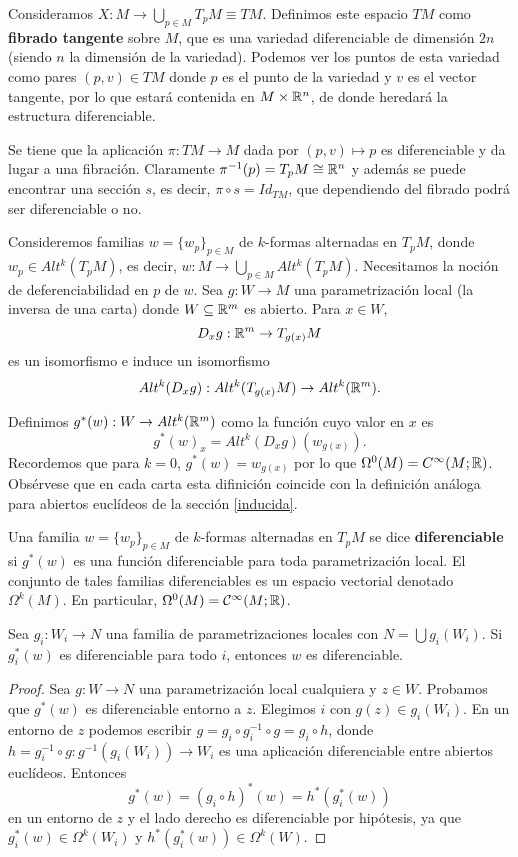 \documentclass[CV.tex]{subfiles}
\begin{document}
\begin{defi}
Consideramos $X:M\to \bigcup_{p\in M}T_pM \equiv TM$. Definimos este espacio $TM$ como \textbf{fibrado tangente} sobre $M$, que es una variedad diferenciable de dimensión $2n$ (siendo $n$ la dimensión de la variedad). Podemos ver los puntos de esta variedad como pares $(p,v)\in TM$ donde $p$ es el punto de la variedad y $v$ es el vector tangente, por lo que estará contenida en $M\times \mathbb{R}^n$, de donde heredará la estructura diferenciable. 
\end{defi}

Se tiene que la aplicación $\pi :TM\to M$ dada por $(p,v)\mapsto p$ es diferenciable y da lugar a una fibración. Claramente $\pi^{-1}(p)=T_pM\cong\mathbb{R}^n$ y además se puede encontrar una sección $s$, es decir, $\pi\circ s=Id_{TM}$, que dependiendo del fibrado podrá ser diferenciable o no.

Consideremos familias $w=\{w_p\}_{p\in M}$ de $k$-formas alternadas en $T_pM$, donde $w_p\in Alt^k(T_pM)$, es decir, $w:M\to \bigcup_{p\in M}Alt^k(T_pM)$. Necesitamos la noción de deferenciabilidad en $p$ de $w$. Sea $g:W\to M$ una parametrización local (la inversa de una carta) donde $W\subseteq\mathbb{R}^m$ es abierto. Para $x\in W$,
\[
D_x g:\mathbb{R}^m\to T_{g(x)}M
\]
es un isomorfismo e induce un isomorfismo
\[
Alt^k(D_xg):Alt^k(T_{g(x)}M)\to Alt^k(\mathbb{R}^m).
\]

Definimos $g^*(w):W\to Alt^k(\mathbb{R}^m)$ como la función cuyo valor en $x$ es
\[
g^*(w)_x=Alt^k(D_xg)(w_{g(x)}).
\]
Recordemos que para $k=0$, $g^*(w)=w_{g(x)}$ por lo que $\Omega^0(M)=C^{\infty}(M;\mathbb{R})$. Obsérvese que en cada carta esta difinición coincide con la definición análoga para abiertos euclídeos de la sección \ref{inducida}.


\begin{defi}
Una familia $w=\{w_p\}_{p\in M}$ de $k$-formas alternadas en $T_pM$ se dice \textbf{diferenciable} si $g^*(w)$ es una función diferenciable para toda parametrización local. El conjunto de tales familias diferenciables es un espacio vectorial denotado $\Omega^k(M)$. En particular, $\Omega^0(M)=\mathcal{C}^{\infty}(M;\mathbb{R})$. 
\end{defi}

\begin{lemma}
Sea $g_i:W_i\to N$ una familia de parametrizaciones locales con $N=\bigcup g_i(W_i)$. Si $g_i^*(w)$ es diferenciable para todo $i$, entonces $w$ es diferenciable.
\end{lemma}
\begin{proof}
Sea $g:W\to N$ una parametrización local cualquiera y $z\in W$. Probamos que $g^*(w)$ es diferenciable entorno a $z$. Elegimos $i$ con $g(z)\in g_i(W_i)$. En un entorno de $z$ podemos escribir $g=g_i\circ g_i^{-1}\circ g=g_i\circ h$, donde $h=g_i^{-1}\circ g:g^{-1}(g_i(W_i))\to W_i$ es una aplicación diferenciable entre abiertos euclídeos. Entonces
\[
g^*(w)=(g_i\circ h)^*(w)=h^*(g_i^*(w))
\]
en un entorno de $z$ y el lado derecho es diferenciable por hipótesis, ya que $ g_i^*(w)\in\Omega^k(W_i)$ y $h^*(g_i^*(w))\in\Omega^k(W)$. 
\end{proof}
\end{document}
